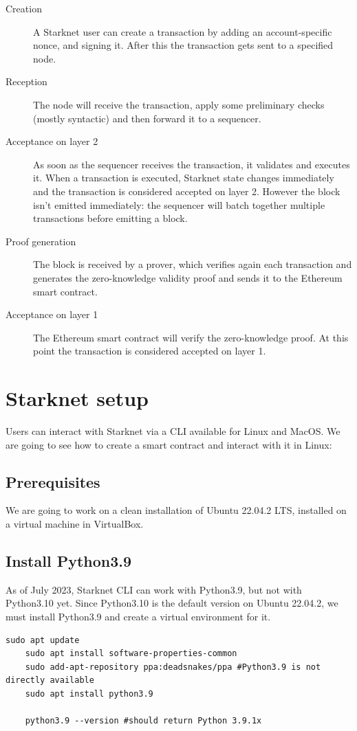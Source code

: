 \documentclass[12pt]{article}
\begin{document}
\begin{description}
    \item[Creation] A Starknet user can create a transaction by adding an account-specific nonce, and signing it. After this the transaction gets sent to a specified node.
    \item[Reception] The node will receive the transaction, apply some preliminary checks (mostly syntactic) and then forward it to a sequencer.
    \item[Acceptance on layer 2] As soon as the sequencer receives the transaction, it validates and executes it. When a transaction is executed, Starknet state changes immediately and the transaction is considered accepted on layer 2. However the block isn't emitted immediately: the sequencer will batch together multiple transactions before emitting a block.
    \item[Proof generation] The block is received by a prover, which verifies again each transaction and generates the zero-knowledge validity proof and sends it to the Ethereum smart contract.
    \item[Acceptance on layer 1] The Ethereum smart contract will verify the zero-knowledge proof. At this point the transaction is considered accepted on layer 1.
\end{description}

\section{Starknet setup} \label{section:starknet_setup}
Users can interact with Starknet via a CLI available for Linux and MacOS. We are going to see how to create a smart contract and interact with it in Linux:

\subsection{Prerequisites} \label{subsection:prerequisites}
We are going to work on a clean installation of Ubuntu 22.04.2 LTS, installed on a virtual machine in VirtualBox.

\subsection{Install Python3.9}
As of July 2023, Starknet CLI can work with Python3.9, but not with Python3.10 yet. Since Python3.10 is the default version on Ubuntu 22.04.2, we must install Python3.9 and create a virtual environment for it.
\begin{lstlisting}[language=terminal]
    sudo apt update
    sudo apt install software-properties-common
    sudo add-apt-repository ppa:deadsnakes/ppa #Python3.9 is not directly available
    sudo apt install python3.9

    python3.9 --version #should return Python 3.9.1x
\end{lstlisting}
\end{document}

